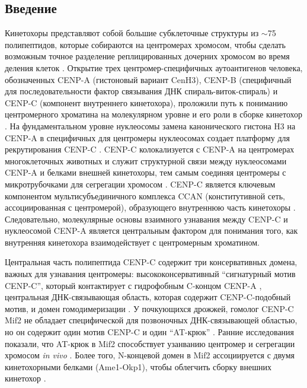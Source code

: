 
\subsection{Введение}
Кинетохоры представляют собой большие субклеточные структуры из $\sim$75 полипептидов, которые собираются на центромерах хромосом, чтобы сделать возможным точное разделение реплицированных дочерних хромосом во время деления клеток \cite{fukagawa_centromere_2004,biggins_composition_2013}. Открытие трех центромер-специфичных аутоантигенов человека, обозначенных CENP-A (гистоновый вариант CenH3), CENP-B (специфичный для последовательности фактор связывания ДНК спираль-виток-спираль) и CENP-C (компонент внутреннего кинетохора), проложили путь к пониманию центромерного хроматина на молекулярном уровне и его роли в сборке кинетохор \cite{fukagawa_centromere_2014}. На фундаментальном уровне нуклеосомы замена канонического гистона H3 на CENP-A в специфичных для центромеры нуклеосомах создает платформу для рекрутирования CENP-C \cite{carroll_dual_2010,gascoigne_induced_2011}. CENP-C колокализуется с CENP-A на центромерах многоклеточных животных и служит структурной связи между нуклеосомами CENP-A и белками внешней кинетохоры, тем самым соединяя центромеры с микротрубочками для сегрегации хромосом \cite{moroi_autoantibody_1980,earnshaw_identification_1985,saitoh_cenp-c_1992,sullivan_determining_2001,biggins_composition_2013}. CENP-C является ключевым компонентом мультисубъединичного комплекса CCAN (конститутивной сеть, ассоциированная с центромерой), образующего внутреннюю часть кинетохоры \cite{weir_insights_2016}. Следовательно, молекулярные основы взаимного узнавания между CENP-C и нуклеосомой CENP-A является центральным фактором для понимания того, как внутренняя кинетохора взаимодействует с центромерным хроматином.

Центральная часть полипептида CENP-C содержит три консервативных домена, важных для узнавания центромеры: высококонсервативный ``сигнатурный мотив CENP-C'', который контактирует с гидрофобным C-концом CENP-A \cite{carroll_dual_2010,kato_conserved_2013}, центральная ДНК-связывающая область, которая содержит CENP-C-подобный мотив, и домен гомодимеризации \cite{brown_sequence_1995,yang_identification_1996,sugimoto_characterization_1997,politi_cenp-c_2002,milks_dissection_2009,trazzi_c-terminal_2009}. У почкующихся дрожжей, гомолог CENP-C Mif2 \cite{meeks-wagner_isolation_1986} не обладает специфической для позвоночных ДНК-связывающей областью, но он содержит один мотив CENP-C и один ``AT-крюк'' \cite{brown_sequence_1995,huth_solution_1997,reeves_structure_2000}. Ранние исследования показали, что AT-крюк в Mif2 способствует узанванию центромер и сегрегации хромосом \textit{in vivo} \cite{brown_sequence_1995,lanini_domains_1995,meluh_evidence_1995,cohen_structural_2008}. Более того, N-концевой домен в Mif2 ассоциируется с двумя кинетохорными белками (Ame1-Okp1), чтобы облегчить сборку внешних кинетохор \cite{hornung_cooperative_2014}.

